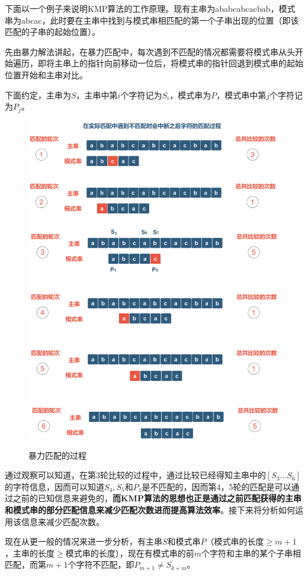 下面以一个例子来说明KMP算法的工作原理。现有主串为ababcabcacbab，模式串为abcac，此时要在主串中找到与模式串相匹配的第一个子串出现的位置（即该匹配的子串的起始位置）。

先由暴力解法讲起，在暴力匹配中，每次遇到不匹配的情况都需要将模式串从头开始遍历，即将主串上的指针向前移动一位后，将模式串的指针回退到模式串的起始位置开始和主串对比。

下面约定，主串为$S$，主串中第$i$个字符记为$S_i$，模式串为$P$，模式串中第$j$个字符记为$P_j$。

\begin{figure}[!htb]
    \centering
    \includegraphics[width=0.8\linewidth]{images/KMP-1.pdf}\\
    \caption{暴力匹配的过程}
\end{figure}

通过观察可以知道，在第3轮比较的过程中，通过比较已经得知主串中的$[S_3\dots S_6]$的字符信息，因而可以知道$S_4,S_5$和$P_1$是不匹配的，因而第4，5轮的匹配是可以通过之前的已知信息来避免的，\textbf{而KMP算法的思想也正是通过之前匹配获得的主串和模式串的部分匹配信息来减少匹配次数进而提高算法效率}。接下来将分析如何运用该信息来减少匹配次数。

现在从更一般的情况来进一步分析，有主串$S$和模式串$P$（模式串的长度$\geq m + 1$，主串的长度$\geq$模式串的长度），现在有模式串的前$m$个字符和主串的某个子串相匹配，而第$m + 1$个字符不匹配，即$P_{m + 1} \neq S_{k + m}$。

